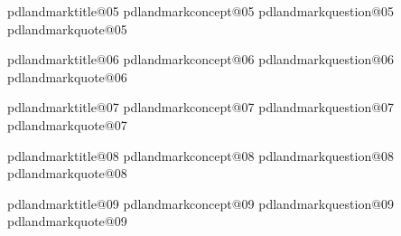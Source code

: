 \expandafter\def\csname pdlandmarktitle@5\endcsname{\csname pdlandmarktitle@05\endcsname}
\expandafter\def\csname pdlandmarkconcept@5\endcsname{\csname pdlandmarkconcept@05\endcsname}
\expandafter\def\csname pdlandmarkquestion@5\endcsname{\csname pdlandmarkquestion@05\endcsname}
\expandafter\def\csname pdlandmarkquote@5\endcsname{\csname pdlandmarkquote@05\endcsname}

\expandafter\def\csname pdlandmarktitle@6\endcsname{\csname pdlandmarktitle@06\endcsname}
\expandafter\def\csname pdlandmarkconcept@6\endcsname{\csname pdlandmarkconcept@06\endcsname}
\expandafter\def\csname pdlandmarkquestion@6\endcsname{\csname pdlandmarkquestion@06\endcsname}
\expandafter\def\csname pdlandmarkquote@6\endcsname{\csname pdlandmarkquote@06\endcsname}

\expandafter\def\csname pdlandmarktitle@7\endcsname{\csname pdlandmarktitle@07\endcsname}
\expandafter\def\csname pdlandmarkconcept@7\endcsname{\csname pdlandmarkconcept@07\endcsname}
\expandafter\def\csname pdlandmarkquestion@7\endcsname{\csname pdlandmarkquestion@07\endcsname}
\expandafter\def\csname pdlandmarkquote@7\endcsname{\csname pdlandmarkquote@07\endcsname}

\expandafter\def\csname pdlandmarktitle@8\endcsname{\csname pdlandmarktitle@08\endcsname}
\expandafter\def\csname pdlandmarkconcept@8\endcsname{\csname pdlandmarkconcept@08\endcsname}
\expandafter\def\csname pdlandmarkquestion@8\endcsname{\csname pdlandmarkquestion@08\endcsname}
\expandafter\def\csname pdlandmarkquote@8\endcsname{\csname pdlandmarkquote@08\endcsname}

\expandafter\def\csname pdlandmarktitle@9\endcsname{\csname pdlandmarktitle@09\endcsname}
\expandafter\def\csname pdlandmarkconcept@9\endcsname{\csname pdlandmarkconcept@09\endcsname}
\expandafter\def\csname pdlandmarkquestion@9\endcsname{\csname pdlandmarkquestion@09\endcsname}
\expandafter\def\csname pdlandmarkquote@9\endcsname{\csname pdlandmarkquote@09\endcsname}

